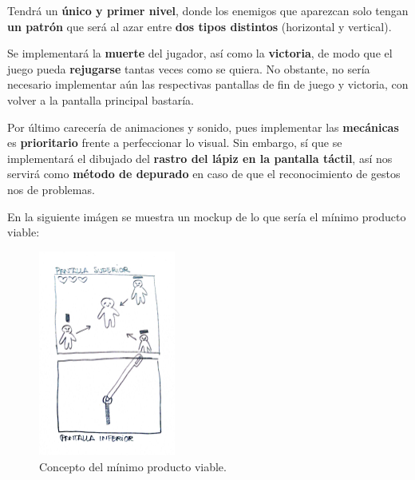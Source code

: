 \vspace{0.5cm}

Tendrá un \textbf{único y primer nivel}, donde los enemigos que aparezcan solo tengan \textbf{un patrón} que será al azar entre \textbf{dos tipos distintos} (horizontal y vertical).

\vspace{0.5cm}

Se implementará la \textbf{muerte} del jugador, así como la \textbf{victoria}, de modo que el juego pueda \textbf{rejugarse} tantas veces como se quiera. No obstante, no sería necesario implementar aún las respectivas pantallas de fin de juego y victoria, con volver a la pantalla principal bastaría.

\vspace{0.5cm}

Por último carecería de animaciones y sonido, pues implementar las \textbf{mecánicas} es \textbf{prioritario} frente a perfeccionar lo visual. Sin embargo, sí que se implementará el dibujado del \textbf{rastro del lápiz en la pantalla táctil}, así nos servirá como \textbf{método de depurado} en caso de que el reconocimiento de gestos nos de problemas.

\vspace{0.5cm}

En la siguiente imágen se muestra un mockup de lo que sería el mínimo producto viable:

\vspace{0.5cm}

\begin{figure}[htbp]
\centering
  \includegraphics[width=0.4\textwidth]{archivos/minimoprod.jpg}
  \caption{Concepto del mínimo producto viable.}
  \label{fig:minimoprod}
\end{figure}
